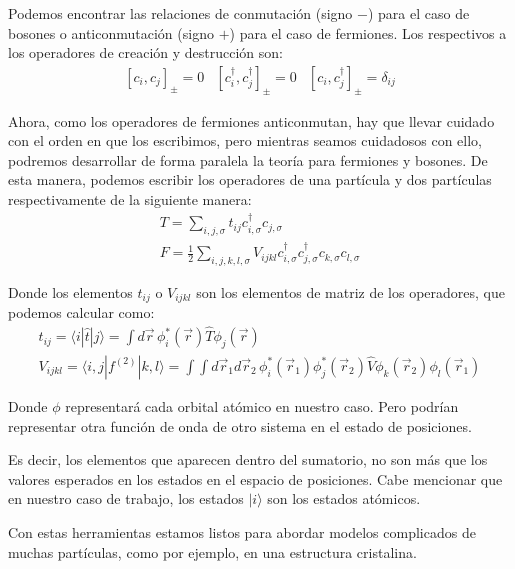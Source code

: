 \documentclass[12pt,twoside]{article}
\begin{document}
Podemos encontrar las relaciones de conmutación (signo $-$) para el caso de bosones o anticonmutación (signo $+$) para el caso de fermiones. Los respectivos a los operadores de creación y destrucción son:
\begin{equation}
  \begin{array}{ccc}
    \left[c_i, c_j\right]_{\pm} = 0 & \left[c_i^{\dagger}, c_j^{\dagger}\right]_{\pm} = 0 & \left[c_i, c_j^{\dagger}\right]_{\pm} = \delta_{ij}
  \end{array}
\end{equation}

Ahora, como los operadores de fermiones anticonmutan, hay que llevar cuidado con el orden en que los escribimos, pero mientras seamos cuidadosos con ello, podremos desarrollar de forma paralela la teoría para fermiones y bosones. De esta manera, podemos escribir los operadores de una partícula y dos partículas respectivamente de la siguiente manera:
\begin{align}
  T = \sum_{i, j, \sigma} t_{ij}c_{i, \sigma}^{\dagger}c_{j, \sigma} \\
  F = \frac{1}{2}\sum_{i, j, k, l, \sigma} V_{ijkl}c_{i, \sigma}^{\dagger}c_{j, \sigma}^{\dagger}c_{k, \sigma} c_{l, \sigma}
  \label{eq:sqOperators}
\end{align}

Donde los elementos $t_{ij}$ o $V_{ijkl}$ son los elementos de matriz de los operadores, que podemos calcular como:
\begin{equation}
  \begin{split}
    t_{ij} = \langle i | \hat{t} | j \rangle = \int d\vec{r} \, \phi_i^*(\vec{r}) \hat{T} \phi_j(\vec{r}) \\ V_{ijkl} = \langle i, j | f^{(2)} | k, l \rangle = \int\int d\vec{r}_1 d\vec{r}_2 \, \phi_i^*(\vec{r}_1) \phi_j^*(\vec{r}_2) \hat{V} \phi_k(\vec{r}_2) \phi_l(\vec{r}_1)
  \end{split}
\end{equation}

Donde $\phi$ representará cada orbital atómico en nuestro caso. Pero podrían representar otra función de onda de otro sistema en el estado de posiciones.

Es decir, los elementos que aparecen dentro del sumatorio, no son más que los valores esperados en los estados en el espacio de posiciones. Cabe mencionar que en nuestro caso de trabajo, los estados $|i\rangle$ son los estados atómicos.

Con estas herramientas estamos listos para abordar modelos complicados de muchas partículas, como por ejemplo, en una estructura cristalina.
\end{document}
